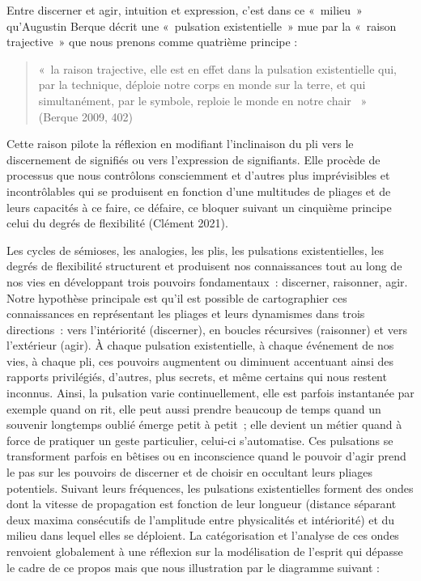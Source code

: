 \documentclass[
  letterpaper,
  DIV=11,
  numbers=noendperiod]{scrreprt}
\begin{document}
Entre discerner et agir, intuition et expression, c'est dans ce
«~milieu~» qu'Augustin Berque décrit une «~pulsation existentielle~» mue
par la «~raison trajective~» que nous prenons comme quatrième principe :

\begin{quote}
«~la raison trajective, elle est en effet dans la pulsation
existentielle qui, par la technique, déploie notre corps en monde sur la
terre, et qui simultanément, par le symbole, reploie le monde en notre
chair ~»~ (Berque 2009, 402)
\end{quote}

Cette raison pilote la réflexion en modifiant l'inclinaison du pli vers
le discernement de signifiés ou vers l'expression de signifiants. Elle
procède de processus que nous contrôlons consciemment et d'autres plus
imprévisibles et incontrôlables qui se produisent en fonction d'une
multitudes de pliages et de leurs capacités à ce faire, ce défaire, ce
bloquer suivant un cinquième principe celui du degrés de flexibilité
(Clément 2021).

Les cycles de sémioses, les analogies, les plis, les pulsations
existentielles, les degrés de flexibilité structurent et produisent nos
connaissances tout au long de nos vies en développant trois pouvoirs
fondamentaux~: discerner, raisonner, agir. Notre hypothèse principale
est qu'il est possible de cartographier ces connaissances en
représentant les pliages et leurs dynamismes dans trois directions~:
vers l'intériorité (discerner), en boucles récursives (raisonner) et
vers l'extérieur (agir). À chaque pulsation existentielle, à chaque
événement de nos vies, à chaque pli, ces pouvoirs augmentent ou
diminuent accentuant ainsi des rapports privilégiés, d'autres, plus
secrets, et même certains qui nous restent inconnus. Ainsi, la pulsation
varie continuellement, elle est parfois instantanée par exemple quand on
rit, elle peut aussi prendre beaucoup de temps quand un souvenir
longtemps oublié émerge petit à petit~; elle devient un métier quand à
force de pratiquer un geste particulier, celui-ci s'automatise. Ces
pulsations se transforment parfois en bêtises ou en inconscience quand
le pouvoir d'agir prend le pas sur les pouvoirs de discerner et de
choisir en occultant leurs pliages potentiels. Suivant leurs fréquences,
les pulsations existentielles forment des ondes dont la vitesse de
propagation est fonction de leur longueur (distance séparant deux maxima
consécutifs de l'amplitude entre physicalités et intériorité) et du
milieu dans lequel elles se déploient. La catégorisation et l'analyse de
ces ondes renvoient globalement à une réflexion sur la modélisation de
l'esprit qui dépasse le cadre de ce propos mais que nous illustration
par le diagramme suivant :
\end{document}
